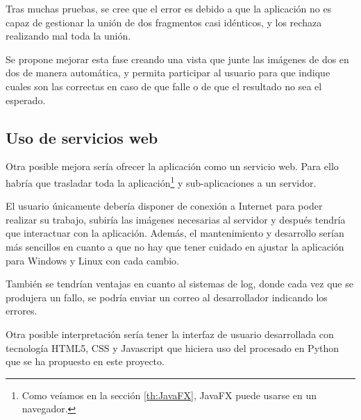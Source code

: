 Tras muchas pruebas, se cree que el error es debido a que la aplicación no es capaz de gestionar la unión de dos fragmentos casi idénticos, y los rechaza realizando mal toda la unión.

Se propone mejorar esta fase creando una vista que junte las imágenes de dos en dos de manera automática, y permita participar al usuario para que indique cuales son las correctas en caso de que falle o de que el resultado no sea el esperado.

\subsection{Uso de servicios web}
Otra posible mejora sería ofrecer la aplicación como un servicio web. Para ello habría que trasladar toda la aplicación\footnote{Como veíamos en la sección \ref{th:JavaFX}, JavaFX puede usarse en un navegador.} y sub-aplicaciones a un servidor. 

El usuario únicamente debería disponer de conexión a Internet para poder realizar su trabajo, subiría las imágenes necesarias al servidor y después tendría que interactuar con la aplicación. Además, el mantenimiento y desarrollo serían más sencillos en cuanto a que no hay que tener cuidado en ajustar la aplicación para Windows y Linux con cada cambio. 

También se tendrían ventajas en cuanto al sistemas de log, donde cada vez que se produjera un fallo, se podría enviar un correo al desarrollador indicando los errores.

Otra posible interpretación sería tener la interfaz de usuario desarrollada con tecnología HTML5, CSS y Javascript que hiciera uso del procesado en Python que se ha propuesto en este proyecto.

